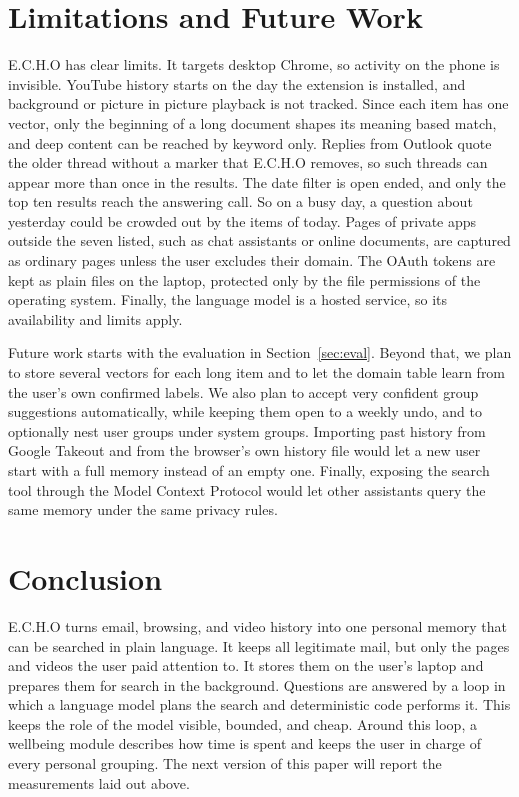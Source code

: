 \documentclass[conference]{IEEEtran}
\begin{document}
\section{Limitations and Future Work}\label{sec:limits}
E.C.H.O has clear limits. It targets desktop Chrome, so activity on the phone is invisible. YouTube history starts on the day the extension is installed, and background or picture in picture playback is not tracked. Since each item has one vector, only the beginning of a long document shapes its meaning based match, and deep content can be reached by keyword only. Replies from Outlook quote the older thread without a marker that E.C.H.O removes, so such threads can appear more than once in the results. The date filter is open ended, and only the top ten results reach the answering call. So on a busy day, a question about yesterday could be crowded out by the items of today. Pages of private apps outside the seven listed, such as chat assistants or online documents, are captured as ordinary pages unless the user excludes their domain. The OAuth tokens are kept as plain files on the laptop, protected only by the file permissions of the operating system. Finally, the language model is a hosted service, so its availability and limits apply.

Future work starts with the evaluation in Section~\ref{sec:eval}. Beyond that, we plan to store several vectors for each long item and to let the domain table learn from the user's own confirmed labels. We also plan to accept very confident group suggestions automatically, while keeping them open to a weekly undo, and to optionally nest user groups under system groups. Importing past history from Google Takeout and from the browser's own history file would let a new user start with a full memory instead of an empty one. Finally, exposing the search tool through the Model Context Protocol would let other assistants query the same memory under the same privacy rules.

\section{Conclusion}\label{sec:conc}
E.C.H.O turns email, browsing, and video history into one personal memory that can be searched in plain language. It keeps all legitimate mail, but only the pages and videos the user paid attention to. It stores them on the user's laptop and prepares them for search in the background. Questions are answered by a loop in which a language model plans the search and deterministic code performs it. This keeps the role of the model visible, bounded, and cheap. Around this loop, a wellbeing module describes how time is spent and keeps the user in charge of every personal grouping. The next version of this paper will report the measurements laid out above.
\end{document}
